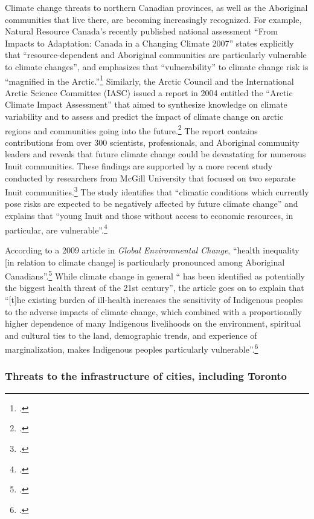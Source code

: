 Climate change threats to northern Canadian provinces, as well as the Aboriginal communities that live there, are becoming increasingly recognized. 
For example, Natural Resource Canada's recently published national assessment ``From Impacts to Adaptation: Canada in a Changing Climate 2007'' states explicitly that ``resource-dependent and Aboriginal communities are particularly vulnerable to climate changes'', and emphasizes that ``vulnerability'' to climate change risk is ``magnified in the Arctic.''\footcite[][p.3, p. 14]{ImpToAda} 
Similarly, the Arctic Council and the International Arctic Science Committee (IASC) issued a report in 2004 entitled the ``Arctic Climate Impact Assessment'' that aimed  to synthesize knowledge on climate variability and to assess and predict the impact of climate change on arctic regions and communities going into the future.\footcite[][]{ACIA2004}
The report contains contributions from over 300 scientists, professionals, and Aboriginal community leaders and reveals that future climate change could be devastating for numerous Inuit communities.
These findings are supported by a more recent study conducted by researchers from McGill University that focused on two separate Inuit communities.\footcite[][]{CCInuitCommunities}
The study identifies that ``climatic conditions which currently pose risks are expected to be negatively affected by future climate change'' and explains that ``young Inuit and those without access to economic resources, in particular, are vulnerable''.\footcite[][p. 45, p. 54]{CCInuitCommunities}



According to a 2009 article in \emph{Global Environmental Change}, ``health inequality [in relation to climate change] is
particularly pronounced among Aboriginal Canadians''.\footcite[][p. 1]{VulAborig2009}
While climate change in general `` has been identified as potentially the biggest health threat of the 21st century'', the article goes on to explain that ``[t]he existing burden of ill-health increases the sensitivity of Indigenous peoples to the adverse impacts of climate change, which combined with a proportionally higher dependence of many Indigenous livelihoods on the environment, spiritual and cultural ties to the land, demographic trends, and experience of marginalization, makes Indigenous peoples particularly vulnerable''.\footcite[][p. 1]{VulAborig2009}



	\subsubsection{Threats to the infrastructure of cities, including Toronto}



